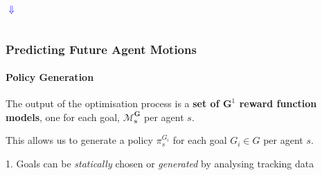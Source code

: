 \begin{frame}
\begin{columns}[T]
		\centering
		
	\end{columns}
	
	\begin{columns}[T]
		\column{\textwidth}
		
		\centering
		\vspace{-3.1cm}
		\hspace{-1cm}
		\Huge
		\begin{rotate}{-45}
			
			\textcolor{blue}{\textbf{$ \Downarrow $}}
		\end{rotate}	
	\end{columns}
\end{frame}

\begin{frame}
	\frametitle{Predicting Future Agent Motions}
	\framesubtitle{Policy Generation}
	
	\LARGE
	
	\vspace{1cm}
	
	The output of the optimisation process is a \textbf{set of $ \mathbf{G}^1 $ reward function models},
	one for each goal, $ \mathbf{\mathcal{M}_s^G} $ per agent $ s $. \\
	
	\vspace{0.4cm}
	
	This allows us to generate a policy $ \pi_s^{G_i} $ for each goal $ G_i \in G $ per agent $ s $. \\
	
	\vspace{1.3cm}
	
	\normalsize
	
	1. Goals can be \emph{statically} chosen or \emph{generated} by analysing tracking data
\end{frame}

%	
%	
%	
%	
%	


